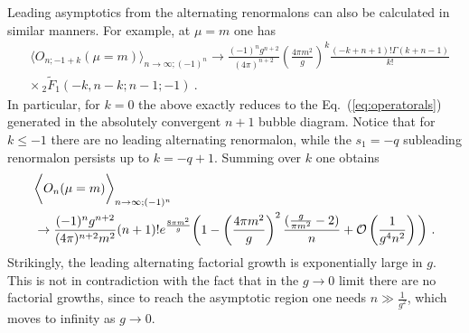 \documentclass[a4paper,11pt]{article}
\begin{document}
Leading asymptotics from the alternating renormalons can also be calculated in similar manners. For example, at $\mu=m$ one has 
\begin{align}
&\bigg\langle O_{n;-1+k}(\mu=m)\bigg\rangle_{n\rightarrow\infty;(-1)^n} \rightarrow \frac{(-1)^ng^{n+2}}{(4\pi)^{n+2}}\left(\frac{4\pi m^2}{g}\right)^k \frac{(-k+n+1)! \Gamma (k+n-1)}{k!} \nonumber \\ 
& \times \, _2\tilde{F}_1(-k,n-k;n-1;-1) \ .
\end{align}
In particular, for $k=0$ the above exactly reduces to the Eq.~(\ref{eq:operatorals}) generated in the absolutely convergent $n+1$ bubble diagram. Notice that for $k\le -1$ there are no leading alternating renormalon, while the $s_1=-q$ subleading renormalon persists up to $k=-q+1$. Summing over $k$ one obtains 
\begin{align}
&\bigg\langle O_{n}(\mu=m)\bigg\rangle_{n\rightarrow\infty;(-1)^n} \nonumber \\ 
& \rightarrow \frac{(-1)^ng^{n+2}}{(4\pi)^{n+2}m^2}(n+1)!e^{\frac{8\pi m^2}{g}}\bigg(1-\left(\frac{4\pi m^2}{g}\right)^2\frac{(\frac{g}{\pi m^2}-2)}{n}+{\cal O}\left(\frac{1}{g^4n^2}\right)\bigg) \ .
\end{align}
Strikingly, the leading alternating factorial growth is exponentially large in $g$. This is not in contradiction with the fact that in the $g\rightarrow 0$ limit there are no factorial growths, since to reach the asymptotic region one needs $n\gg \frac{1}{g^2}$, which moves to infinity as $g\rightarrow 0$.  
\end{document}
